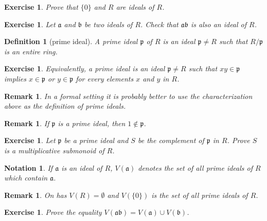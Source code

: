 \documentclass[12pt]{article}
\newtheorem{definition}[proposition]{Definition}
\newtheorem{remark}[proposition]{Remark}
\newtheorem{ex}[proposition]{Exercise}
\newtheorem{notation}{Notation}
\begin{document}
\begin{ex}
	Prove that $\lbrace 0 \rbrace$ and $R$ are ideals of $R$.
\end{ex}

\begin{ex}
	Let $\mathfrak{a}$ and $\mathfrak{b}$ be two ideals of $R$. Check that $\mathfrak{a} \mathfrak{b}$ is also an ideal of $R$.
\end{ex}
		
\begin{definition}[prime ideal]
	A prime ideal $\mathfrak{p}$ of $R$ is an ideal $\mathfrak{p} \neq R$ such that $R/\mathfrak{p}$ is an entire ring. 	
\end{definition}

\begin{ex}
	Equivalently, a prime ideal is an ideal $\mathfrak{p} \neq R$ such that $x y \in \mathfrak{p}$ implies $x \in \mathfrak{p}$ or $y \in \mathfrak{p}$ for every elements $x$ and $y$ in $R$.
\end{ex}

\begin{remark}
	In a formal setting it is probably better to use the characterization above as the definition of prime ideals.
\end{remark}

\begin{remark}
	If $\mathfrak{p}$ is a prime ideal, then $1 \notin \mathfrak{p}$.
\end{remark}

\begin{ex}
	Let $\mathfrak{p}$ be a prime ideal and $S$ be the complement of $\mathfrak{p}$ in $R$. Prove $S$ is a multiplicative submonoid of $R$. 
\end{ex}		

\begin{notation}
	If $\mathfrak{a}$ is an ideal of $R$, $V(\mathfrak{a})$ denotes the set of all prime ideals of $R$ which contain $\mathfrak{a}$. 
\end{notation}

\begin{remark}
	On has $V(R) = \emptyset$ and $V(\lbrace 0 \rbrace)$ is the set of all prime ideals of $R$.
\end{remark}	

\begin{ex}
Prove the equality $V(\mathfrak{a} \mathfrak{b}) = V(\mathfrak{a}) \cup V(\mathfrak{b})$.	
\end{ex}
\end{document}
